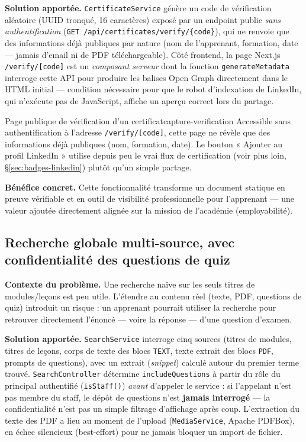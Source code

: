 \textbf{Solution apportée.} \texttt{CertificateService} génère un code de
vérification aléatoire (UUID tronqué, 16 caractères) exposé par un
endpoint public \emph{sans authentification}
(\texttt{GET /api/certificates/verify/\{code\}}), qui ne renvoie que des
informations déjà publiques par nature (nom de l'apprenant, formation,
date --- jamais d'email ni de PDF téléchargeable). Côté frontend, la page
Next.js \texttt{/verify/[code]} est un \emph{composant serveur} dont la
fonction \texttt{generateMetadata} interroge cette API pour produire les
balises Open Graph directement dans le HTML initial --- condition
nécessaire pour que le robot d'indexation de LinkedIn, qui n'exécute pas
de JavaScript, affiche un aperçu correct lors du partage.

  {Page publique de vérification d'un certificat}{capture-verification}
  {Accessible sans authentification à l'adresse \texttt{/verify/[code]},
   cette page ne révèle que des informations déjà publiques (nom,
   formation, date). Le bouton « Ajouter au profil LinkedIn » utilise
   depuis peu le vrai flux de certification (voir plus loin,
   \S\ref{sec:badges-linkedin}) plutôt qu'un simple partage.}

\textbf{Bénéfice concret.} Cette fonctionnalité transforme un document
statique en preuve vérifiable et en outil de visibilité professionnelle
pour l'apprenant --- une valeur ajoutée directement alignée sur la mission
de l'académie (employabilité).

\subsection{Recherche globale multi-source, avec confidentialité des questions de quiz}
\label{sec:recherche-globale}

\textbf{Contexte du problème.} Une recherche naïve sur les seuls titres de
modules/leçons est peu utile. L'étendre au contenu réel (texte, PDF,
questions de quiz) introduit un risque : un apprenant pourrait utiliser la
recherche pour retrouver directement l'énoncé --- voire la réponse --- d'une
question d'examen.

\textbf{Solution apportée.} \texttt{SearchService} interroge cinq sources
(titres de modules, titres de leçons, corps de texte des blocs \texttt{TEXT},
texte extrait des blocs \texttt{PDF}, prompts de questions), avec un
extrait (\emph{snippet}) calculé autour du premier terme trouvé.
\texttt{SearchController} détermine \texttt{includeQuestions} à partir du
rôle du principal authentifié (\texttt{isStaff()}) \emph{avant} d'appeler le
service : si l'appelant n'est pas membre du staff, le dépôt de questions
n'est \textbf{jamais interrogé} --- la confidentialité n'est pas un simple
filtrage d'affichage après coup. L'extraction du texte des PDF a lieu au
moment de l'upload (\texttt{MediaService}, Apache PDFBox), en échec
silencieux (best-effort) pour ne jamais bloquer un import de fichier.


